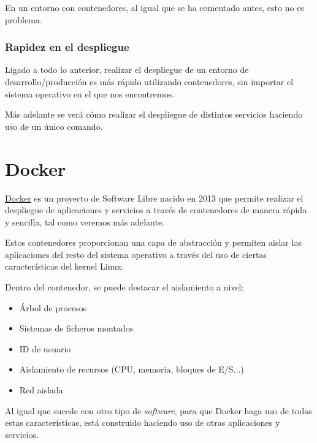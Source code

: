 
En un entorno con contenedores, al igual que se ha comentado antes, esto no es problema.

\subsection{Rapidez en el despliegue}

Ligado a todo lo anterior, realizar el despliegue de un entorno de desarrollo/producción es más rápido utilizando contenedores, sin importar el sistema operativo en el que nos encontremos.


Más adelante se verá cómo realizar el despliegue de distintos servicios haciendo uso de un único comando.


\chapter{Docker}

\href{https://www.docker.com/}{Docker} es un proyecto de Software Libre nacido en 2013 que permite realizar el despliegue de aplicaciones y servicios a través de contenedores de manera rápida y sencilla, tal como veremos más adelante.

Estos contenedores proporcionan una capa de abstracción y permiten aislar las aplicaciones del resto del sistema operativo a través del uso de ciertas características del kernel Linux.

Dentro del contenedor, se puede destacar el aislamiento a nivel:

\begin{itemize}
    \item Árbol de procesos
    \item Sistemas de ficheros montados
    \item ID de usuario
    \item Aislamiento de recursos (CPU, memoria, bloques de E/S...)
    \item Red aislada
\end{itemize}

Al igual que sucede con otro tipo de \textit{software},  para que Docker haga uso de todas estas características, está construido haciendo uso de otras aplicaciones y servicios.


